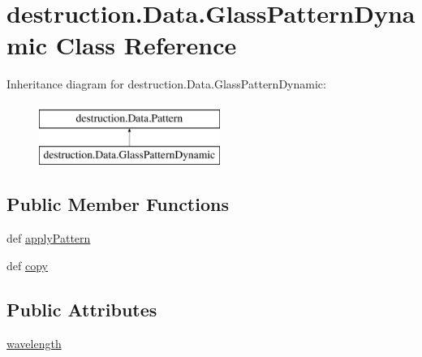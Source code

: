 \hypertarget{classdestruction_1_1_data_1_1_glass_pattern_dynamic}{\section{destruction.\-Data.\-Glass\-Pattern\-Dynamic Class Reference}
\label{classdestruction_1_1_data_1_1_glass_pattern_dynamic}
}
Inheritance diagram for destruction.\-Data.\-Glass\-Pattern\-Dynamic\-:\begin{figure}[H]
\begin{center}
\leavevmode
\includegraphics[height=2.000000cm]{classdestruction_1_1_data_1_1_glass_pattern_dynamic}
\end{center}
\end{figure}
\subsection*{Public Member Functions}
\begin{DoxyCompactItemize}
\item 
def \hyperlink{classdestruction_1_1_data_1_1_glass_pattern_dynamic_a8ad8231e9f33b7ca8b78fc71c6571ba7}{apply\-Pattern}
\item 
def \hyperlink{classdestruction_1_1_data_1_1_glass_pattern_dynamic_a25a2377af2adec69654dbea84b13a13b}{copy}
\end{DoxyCompactItemize}
\subsection*{Public Attributes}
\begin{DoxyCompactItemize}
\item 
\hyperlink{classdestruction_1_1_data_1_1_glass_pattern_dynamic_a0e2482db7d3977e0de50c222acc15acd}{wavelength}
\end{DoxyCompactItemize}


